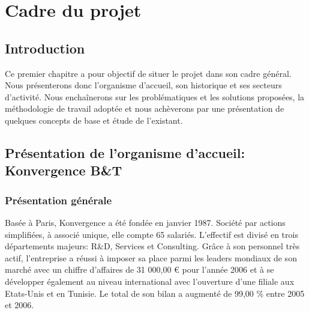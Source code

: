 \setcounter{mtc}{5} %
\chapter{Cadre du projet}
\minitoc %
\graphicspath{{Chapitre1/figures/}}
\pagestyle{fancy}
\fancyhf{}
\fancyhead[R]{\bfseries\rightmark}
\fancyfoot[R]{\thepage}
\renewcommand{\headrulewidth}{0.5pt}
\renewcommand{\footrulewidth}{0pt}
\renewcommand{\chaptermark}[1]{\markboth{\MakeUppercase{\chaptername~\thechapter. #1 }}{}}
\renewcommand{\sectionmark}[1]{\markright{\thechapter.\thesection~ #1}}

\begin{spacing}{1.2}
\section*{Introduction}
Ce premier chapitre a pour objectif de situer le projet dans son cadre général. Nous présenterons donc l’organisme d’accueil, son historique et ses secteurs d'activité. Nous enchaînerons sur les problématiques et les solutions proposées, la méthodologie de travail adoptée et nous achèverons par une présentation de quelques concepts de base et étude de l’existant.
\vspace{-3mm}
\section{Présentation de l'organisme d’accueil: Konvergence B\&T}
\subsection{Présentation générale}
Basée à Paris, Konvergence a été fondée en janvier 1987. Société par actions simplifiées, à associé unique, elle compte 65 salariés. L'effectif est divisé en trois départements majeurs: R\&D, Services et Consulting. Grâce à son personnel très actif, l’entreprise a réussi à imposer sa place parmi les leaders mondiaux de son marché avec un chiffre d'affaires de 31 000,00 € pour l'année 2006 et à se développer également au niveau international avec l’ouverture d’une filiale aux Etats-Unis et en Tunisie. Le total de son bilan a augmenté de 99,00 \% entre 2005 et 2006.\\


\end{spacing}
